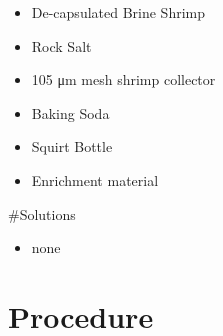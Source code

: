 \documentclass[
  letterpaper,
  DIV=11,
  numbers=noendperiod]{scrreprt}
\providecommand{\tightlist}{%
  \setlength{\itemsep}{0pt}\setlength{\parskip}{0pt}}\usepackage{longtable,booktabs,array}
\begin{document}
\begin{itemize}
\tightlist
\item
  De-capsulated Brine Shrimp
\item
  Rock Salt
\item
  105 μm mesh shrimp collector
\item
  Baking Soda
\item
  Squirt Bottle
\item
  Enrichment material
\end{itemize}

\#Solutions

\begin{itemize}
\tightlist
\item
  none
\end{itemize}

\hypertarget{procedure-29}{%
\section{Procedure}\label{procedure-29}}
\end{document}
